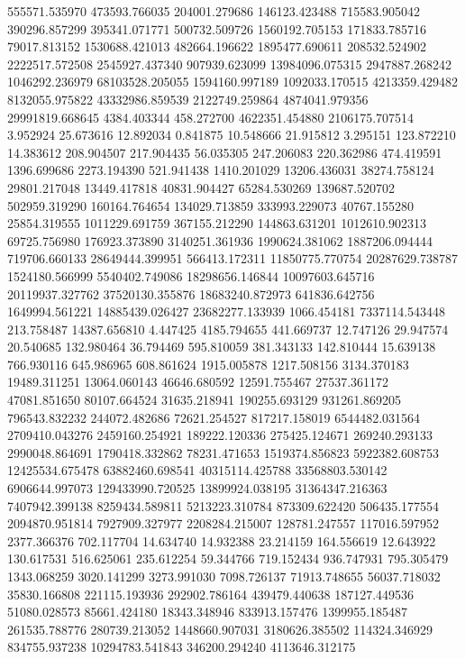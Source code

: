 555571.535970
473593.766035
204001.279686
146123.423488
715583.905042
390296.857299
395341.071771
500732.509726
1560192.705153
171833.785716
79017.813152
1530688.421013
482664.196622
1895477.690611
208532.524902
2222517.572508
2545927.437340
907939.623099
13984096.075315
2947887.268242
1046292.236979
68103528.205055
1594160.997189
1092033.170515
4213359.429482
8132055.975822
43332986.859539
2122749.259864
4874041.979356
29991819.668645
4384.403344
458.272700
4622351.454880
2106175.707514
3.952924
25.673616
12.892034
0.841875
10.548666
21.915812
3.295151
123.872210
14.383612
208.904507
217.904435
56.035305
247.206083
220.362986
474.419591
1396.699686
2273.194390
521.941438
1410.201029
13206.436031
38274.758124
29801.217048
13449.417818
40831.904427
65284.530269
139687.520702
502959.319290
160164.764654
134029.713859
333993.229073
40767.155280
25854.319555
1011229.691759
367155.212290
144863.631201
1012610.902313
69725.756980
176923.373890
3140251.361936
1990624.381062
1887206.094444
719706.660133
28649444.399951
566413.172311
11850775.770754
20287629.738787
1524180.566999
5540402.749086
18298656.146844
10097603.645716
20119937.327762
37520130.355876
18683240.872973
641836.642756
1649994.561221
14885439.026427
23682277.133939
1066.454181
7337114.543448
213.758487
14387.656810
4.447425
4185.794655
441.669737
12.747126
29.947574
20.540685
132.980464
36.794469
595.810059
381.343133
142.810444
15.639138
766.930116
645.986965
608.861624
1915.005878
1217.508156
3134.370183
19489.311251
13064.060143
46646.680592
12591.755467
27537.361172
47081.851650
80107.664524
31635.218941
190255.693129
931261.869205
796543.832232
244072.482686
72621.254527
817217.158019
6544482.031564
2709410.043276
2459160.254921
189222.120336
275425.124671
269240.293133
2990048.864691
1790418.332862
78231.471653
1519374.856823
5922382.608753
12425534.675478
63882460.698541
40315114.425788
33568803.530142
6906644.997073
129433990.720525
13899924.038195
31364347.216363
7407942.399138
8259434.589811
5213223.310784
873309.622420
506435.177554
2094870.951814
7927909.327977
2208284.215007
128781.247557
117016.597952
2377.366376
702.117704
14.634740
14.932388
23.214159
164.556619
12.643922
130.617531
516.625061
235.612254
59.344766
719.152434
936.747931
795.305479
1343.068259
3020.141299
3273.991030
7098.726137
71913.748655
56037.718032
35830.166808
221115.193936
292902.786164
439479.440638
187127.449536
51080.028573
85661.424180
18343.348946
833913.157476
1399955.185487
261535.788776
280739.213052
1448660.907031
3180626.385502
114324.346929
834755.937238
10294783.541843
346200.294240
4113646.312175
